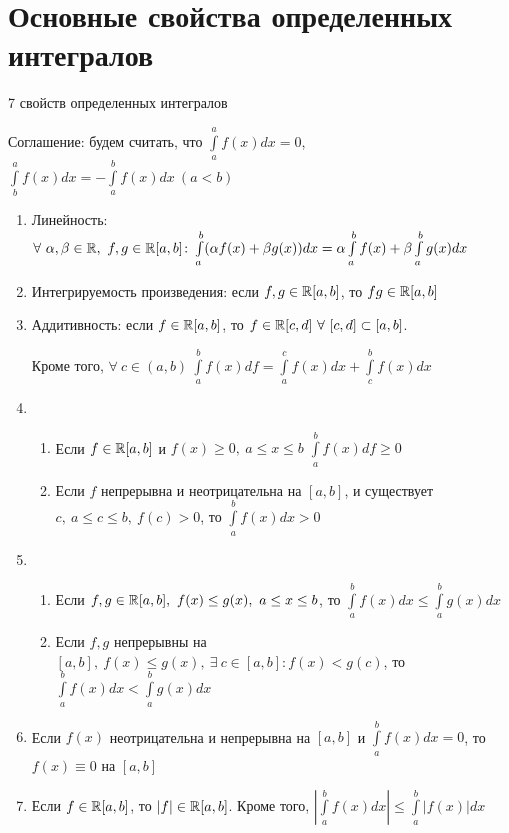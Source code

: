 \section{Основные свойства определенных интегралов}
\begin{theor}7 свойств определенных интегралов

Соглашение: будем считать, что $\int\limits^a_af(x)dx=0$, $\int\limits^a_bf(x)dx=-\int\limits^b_af(x)dx\ (a<b)$
\begin{enumerate}
\item Линейность: $\forall\ \alpha,\beta\in\R,\ f,g\in\R[a,b]\colon\int\limits^b_a(\alpha f(x)+\beta g(x))dx=\alpha\int\limits^b_af(x)+\beta\int\limits^b_ag(x)dx$
\item Интегрируемость произведения: если $f,g\in\mathbb{R}[a,b]$, то $fg\in\mathbb{R}[a,b]$
\item Аддитивность: если $f\in\mathbb{R}[a,b]$, то $f\in\R[c,d]\ \forall\ [c,d]\subset[a,b]$.

Кроме того, $\forall\ c\in(a,b)\ \int\limits^b_af(x)df=\int\limits^c_af(x)dx+\int\limits^b_cf(x)dx$
\item
\begin{enumerate}
\item Если $f\in\mathbb{R}[a,b]$ и $f(x)\geq0,\ a\leq x\leq b$ \then $\int\limits^b_af(x)df\geq0$
\item Если $f$ непрерывна и неотрицательна на $[a,b]$, и существует $c,\ a\leq c \leq b,\ f(c)>0$, то $\int\limits^b_af(x)dx>0$
\end{enumerate}
\item
\begin{enumerate}
\item Если $f,g\in\R[a,b],\ f(x)\leq g(x),\ a\leq x\leq b$, то $\int\limits^b_af(x)dx\leq\int\limits^b_ag(x)dx$
\item Если $f,g$ непрерывны на $[a,b],\ f(x)\leq g(x),\ \exists\ c\in[a,b]\colon f(x)<g(c)$, то $\int\limits^b_af(x)dx<\int\limits^b_ag(x)dx$
\end{enumerate}
\item Если $f(x)$ неотрицательна и непрерывна на $[a,b]$ и $\int\limits^b_af(x)dx=0$, то $f(x)\equiv0$ на $[a,b]$
\item Если $f\in\mathbb{R}[a,b]$, то $|f|\in\mathbb{R}[a,b]$. Кроме того, $|\int\limits^b_af(x)dx|\leq\int\limits^b_a|f(x)|dx$
\end{enumerate}
\end{theor}
